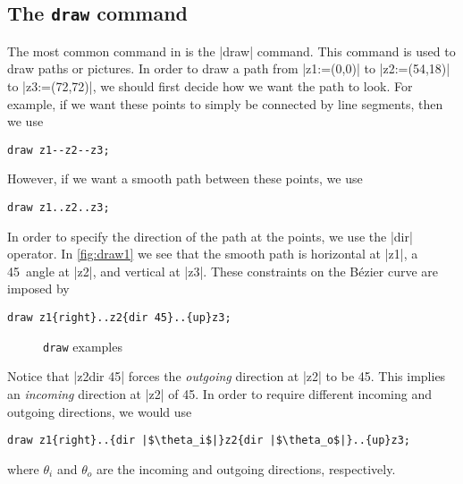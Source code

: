 \subsection{The \texttt{draw} command}

The most common command in \MP{} is the |draw| command.  This command is
used to draw paths or pictures.  In order to draw a path from
|z1:=(0,0)| to |z2:=(54,18)| to |z3:=(72,72)|, we should first decide
how we want the path to look.  For example, if we want these points to
simply be connected by line segments, then we use

\begin{lstlisting}[style=MP]
draw z1--z2--z3;
\end{lstlisting}

However, if we want a smooth path between these points, we use

\begin{lstlisting}[style=MP]
draw z1..z2..z3;
\end{lstlisting}

In order to specify the direction of the path at the points, we use the
|dir| operator.  In \autoref{fig:draw1} we see that the smooth path is
horizontal at |z1|, a 45\textdegree\ angle at |z2|, and vertical at
|z3|.  These constraints on the B\'{e}zier curve are imposed by

\begin{lstlisting}[style=MP]
draw z1{right}..z2{dir 45}..{up}z3;
\end{lstlisting}

\begin{figure}
  \centering
  \caption{\texttt{draw} examples}
  \label{fig:draw1}
\end{figure}

Notice that |z2{dir 45}| forces the \textit{outgoing} direction at |z2|
to be 45\textdegree.  This implies an \textit{incoming} direction at
|z2| of 45\textdegree.  In order to require different incoming and
outgoing directions, we would use

\begin{lstlisting}[style=MP]
draw z1{right}..{dir |$\theta_i$|}z2{dir |$\theta_o$|}..{up}z3;
\end{lstlisting}
where $\theta_i$ and $\theta_o$ are the incoming and outgoing
directions, respectively.
